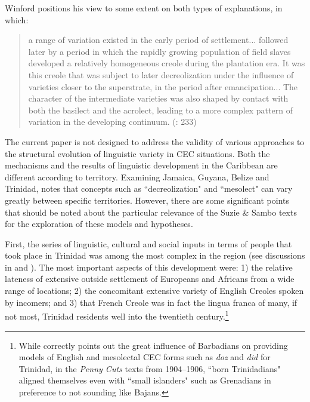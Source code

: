 \documentclass[output=paper,colorlinks,citecolor=brown]{langscibook}
\begin{document}
Winford positions his view to some extent on both types of explanations, in which: 

\begin{quote}
a range of variation existed in the early period of settlement... followed later by a period in which the rapidly growing population of field slaves developed a relatively homogeneous creole during the plantation era. It was this creole that was subject to later decreolization under the influence of varieties closer to the superstrate, in the period after emancipation... The character of the intermediate varieties was also shaped by contact with both the basilect and the acrolect, leading to a more complex pattern of variation in the developing continuum. (\cite{Winford1997re-exam}: 233) 
\end{quote}

The current paper is not designed to address the validity of various approaches to the structural evolution of linguistic variety in CEC situations.  Both the mechanisms and the results of linguistic development in the Caribbean are different according to territory.  Examining Jamaica, Guyana, Belize and Trinidad, \citet{Winford1997re-exam} notes that concepts such as ``decreolization" and ``mesolect" can vary greatly between specific territories. However, there are some significant points that should be noted about the particular relevance of the Suzie \& Sambo texts for the exploration of these models and hypotheses.

First, the series of linguistic, cultural and social inputs in terms of people that took place in Trinidad was among the most complex in the region (see discussions in  \citet{winer1993,winer1995penny,winer2009} and \citet[249--252]{Winford1997re-exam}).  The most important aspects of this development were:
1) the relative lateness of extensive outside settlement of Europeans and Africans from a wide range of locations;
2) the concomitant extensive variety of English Creoles spoken by incomers; and
3) that French Creole was in fact the lingua franca of many, if not most, Trinidad residents well into the twentieth century.\footnote{While \citet[251]{Winford1997re-exam} correctly points out the great influence of Barbadians on providing  models of English and mesolectal CEC forms such as \textit{doz} and \textit{did} for Trinidad, in the \textit{Penny Cuts} texts \citep{winer1995penny} from 1904--1906, ``born Trinidadians" aligned themselves even with ``small islanders" such as Grenadians in preference to not sounding like Bajans.}
\end{document}
